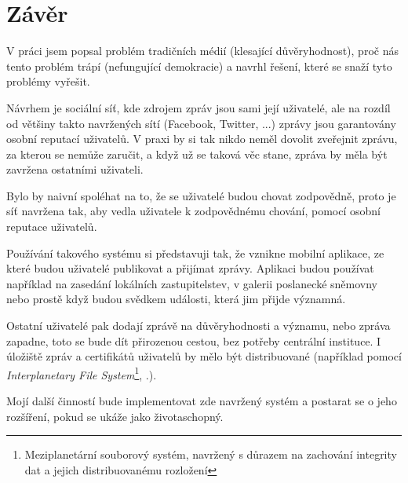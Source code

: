 \documentclass[a4papper]{article}
\begin{document}
\section{Závěr}
\label{ch:zaver}

V práci jsem popsal problém tradičních médií (klesající důvěryhodnost), proč nás tento problém trápí (nefungující demokracie) a navrhl řešení, které se snaží tyto problémy vyřešit.

Návrhem je sociální síť, kde zdrojem zpráv jsou sami její uživatelé, ale na rozdíl od většiny takto navržených sítí (Facebook, Twitter, ...) zprávy jsou garantovány osobní reputací uživatelů. V praxi by si tak nikdo neměl dovolit zveřejnit zprávu, za kterou se nemůže zaručit, a když už se taková věc stane, zpráva by měla být zavržena ostatními uživateli.

Bylo by naivní spoléhat na to, že se uživatelé budou chovat zodpovědně, proto je síť navržena tak, aby vedla uživatele k zodpovědnému chování, pomocí osobní reputace uživatelů.

Používání takového systému si představuji tak, že vznikne mobilní aplikace, ze které budou uživatelé publikovat a přijímat zprávy. Aplikaci budou používat například na zasedání lokálních zastupitelstev, v galerii poslanecké sněmovny nebo prostě když budou svědkem události, která jim přijde významná.

Ostatní uživatelé pak dodají zprávě na důvěryhodnosti a významu, nebo zpráva zapadne, toto se bude dít přirozenou cestou, bez potřeby centrální instituce. I úložiště zpráv a certifikátů uživatelů by mělo být distribuované (například pomocí \textit{Interplanetary File System}\footnote{Meziplanetární souborový systém, navržený s důrazem na zachování integrity dat a jejich distribuovanému rozložení}, \cite{benet14}.).

Mojí další činností bude implementovat zde navržený systém a postarat se o jeho rozšíření, pokud se ukáže jako životaschopný.

\printbibliography[heading=bibintoc]
\end{document}
